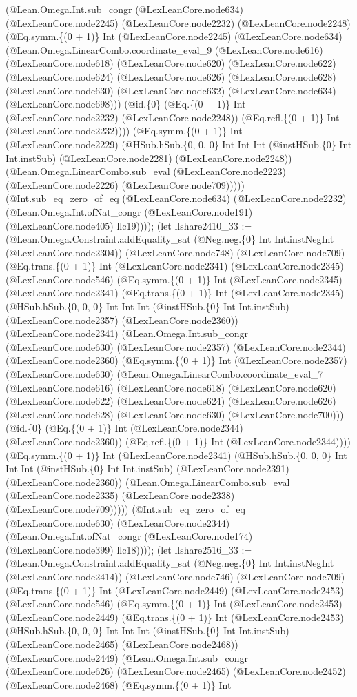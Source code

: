\documentclass[11pt]{article}
\begin{document}
(@Lean.Omega.Int.sub\_congr (@LexLeanCore.node634) (@LexLeanCore.node2245) (@LexLeanCore.node2232) (@LexLeanCore.node2248) (@Eq.symm.\{(0 + 1)\} Int (@LexLeanCore.node2245) (@LexLeanCore.node634) (@Lean.Omega.LinearCombo.coordinate\_eval\_9 (@LexLeanCore.node616) (@LexLeanCore.node618) (@LexLeanCore.node620) (@LexLeanCore.node622) (@LexLeanCore.node624) (@LexLeanCore.node626) (@LexLeanCore.node628) (@LexLeanCore.node630) (@LexLeanCore.node632) (@LexLeanCore.node634) (@LexLeanCore.node698))) (@id.\{0\} (@Eq.\{(0 + 1)\} Int (@LexLeanCore.node2232) (@LexLeanCore.node2248)) (@Eq.refl.\{(0 + 1)\} Int (@LexLeanCore.node2232)))) (@Eq.symm.\{(0 + 1)\} Int (@LexLeanCore.node2229) (@HSub.hSub.\{0, 0, 0\} Int Int Int (@instHSub.\{0\} Int Int.instSub) (@LexLeanCore.node2281) (@LexLeanCore.node2248)) (@Lean.Omega.LinearCombo.sub\_eval (@LexLeanCore.node2223) (@LexLeanCore.node2226) (@LexLeanCore.node709))))) (@Int.sub\_eq\_zero\_of\_eq (@LexLeanCore.node634) (@LexLeanCore.node2232) (@Lean.Omega.Int.ofNat\_congr (@LexLeanCore.node191) (@LexLeanCore.node405) llc19)))); (let llshare2410\_33 := (@Lean.Omega.Constraint.addEquality\_sat (@Neg.neg.\{0\} Int Int.instNegInt (@LexLeanCore.node2304)) (@LexLeanCore.node748) (@LexLeanCore.node709) (@Eq.trans.\{(0 + 1)\} Int (@LexLeanCore.node2341) (@LexLeanCore.node2345) (@LexLeanCore.node546) (@Eq.symm.\{(0 + 1)\} Int (@LexLeanCore.node2345) (@LexLeanCore.node2341) (@Eq.trans.\{(0 + 1)\} Int (@LexLeanCore.node2345) (@HSub.hSub.\{0, 0, 0\} Int Int Int (@instHSub.\{0\} Int Int.instSub) (@LexLeanCore.node2357) (@LexLeanCore.node2360)) (@LexLeanCore.node2341) (@Lean.Omega.Int.sub\_congr (@LexLeanCore.node630) (@LexLeanCore.node2357) (@LexLeanCore.node2344) (@LexLeanCore.node2360) (@Eq.symm.\{(0 + 1)\} Int (@LexLeanCore.node2357) (@LexLeanCore.node630) (@Lean.Omega.LinearCombo.coordinate\_eval\_7 (@LexLeanCore.node616) (@LexLeanCore.node618) (@LexLeanCore.node620) (@LexLeanCore.node622) (@LexLeanCore.node624) (@LexLeanCore.node626) (@LexLeanCore.node628) (@LexLeanCore.node630) (@LexLeanCore.node700))) (@id.\{0\} (@Eq.\{(0 + 1)\} Int (@LexLeanCore.node2344) (@LexLeanCore.node2360)) (@Eq.refl.\{(0 + 1)\} Int (@LexLeanCore.node2344)))) (@Eq.symm.\{(0 + 1)\} Int (@LexLeanCore.node2341) (@HSub.hSub.\{0, 0, 0\} Int Int Int (@instHSub.\{0\} Int Int.instSub) (@LexLeanCore.node2391) (@LexLeanCore.node2360)) (@Lean.Omega.LinearCombo.sub\_eval (@LexLeanCore.node2335) (@LexLeanCore.node2338) (@LexLeanCore.node709))))) (@Int.sub\_eq\_zero\_of\_eq (@LexLeanCore.node630) (@LexLeanCore.node2344) (@Lean.Omega.Int.ofNat\_congr (@LexLeanCore.node174) (@LexLeanCore.node399) llc18)))); (let llshare2516\_33 := (@Lean.Omega.Constraint.addEquality\_sat (@Neg.neg.\{0\} Int Int.instNegInt (@LexLeanCore.node2414)) (@LexLeanCore.node746) (@LexLeanCore.node709) (@Eq.trans.\{(0 + 1)\} Int (@LexLeanCore.node2449) (@LexLeanCore.node2453) (@LexLeanCore.node546) (@Eq.symm.\{(0 + 1)\} Int (@LexLeanCore.node2453) (@LexLeanCore.node2449) (@Eq.trans.\{(0 + 1)\} Int (@LexLeanCore.node2453) (@HSub.hSub.\{0, 0, 0\} Int Int Int (@instHSub.\{0\} Int Int.instSub) (@LexLeanCore.node2465) (@LexLeanCore.node2468)) (@LexLeanCore.node2449) (@Lean.Omega.Int.sub\_congr (@LexLeanCore.node626) (@LexLeanCore.node2465) (@LexLeanCore.node2452) (@LexLeanCore.node2468) (@Eq.symm.\{(0 + 1)\} Int 
\end{document}
